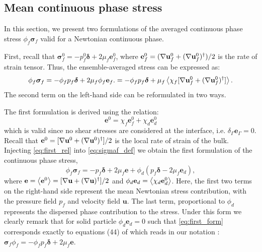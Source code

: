 \subsection{Mean continuous phase stress}

In this section, we present two formulations of the averaged continuous phase stress $\phi_f\bm\sigma_f$ valid for a Newtonian continuous phase. 

First, recall that $\bm\sigma_f^0 = -p_f^0 \bm\delta +2  \mu_f \textbf{e}_f^0$, where $\textbf{e}_f^0 = (\mathbf{\nabla} \textbf{u}_f^0 + (\mathbf{\nabla} \textbf{u}_f^0)^\dagger)/2$ is the rate of strain tensor. 
Thus, the ensemble-averaged stress can be expressed as:
\begin{equation}
    \phi_f\bm\sigma_f
    = 
    -\phi_f p_f \bm\delta + 2 \mu_f \phi_f \textbf{e}_f. 
    = 
    -\phi_f p_f \bm\delta + \mu_f \avg{\chi_f [\grad \textbf{u}_f^0 + (\grad \textbf{u}_f^0)^\dagger]}. 
    \label{eq:sigmaf_def}
\end{equation}
The second term on the left-hand side can be reformulated in two ways. 

The first formulation is derived using the relation: 
\begin{equation}
    \textbf{e}^0
    = 
    \chi_f \textbf{e}_f^0
    + 
    \chi_d \textbf{e}_d^0
    \label{eq:first_rel}
\end{equation}
which is valid since no shear stresses are considered at the interface, i.e. $\delta_\Gamma\textbf{e}_\Gamma = 0$. 
Recall that $\textbf{e}^0 = [\mathbf{\nabla} \textbf{u}^0 + (\mathbf{\nabla} \textbf{u}^0)^\dagger]/2$ is the local rate of strain of the bulk.  
Injecting \ref{eq:first_rel} into \ref{eq:sigmaf_def} we obtain the first formulation of the continuous phase stress, 
\begin{equation}
    \phi_f\bm\sigma_f
    = 
    - p_f \bm\delta + 2 \mu_f \textbf{e}
    +\phi_d ( p_f\bm\delta - 2 \mu_f \textbf{e}_d), 
    \label{eq:first_form}
\end{equation}
where $\textbf{e} = \left<\textbf{e}^0\right> = [\mathbf{\nabla} \textbf{u} + (\mathbf{\nabla} \textbf{u})^\dagger]/2$ and $\phi_d \textbf{e}_d = \left<\chi_d \textbf{e}_d^0\right>$. 
Here, the first two terms on the right-hand side represent the mean Newtonian stress contribution, with the pressure field $p_f$ and velocity field $\textbf{u}$.
The last term, proportional to $\phi_d$ represents the dispersed phase contribution to the stress.
Under this form we clearly remark that for solid particle $\phi_d \textbf{e}_d = 0$ such that \ref{eq:first_form} corresponds exactly to equations (44) of \citet{jackson1997locally} which reads in our notation : $\bm\sigma_f\phi_f =-\phi_f p_f \bm\delta + 2 \mu_f \textbf{e}$. 

